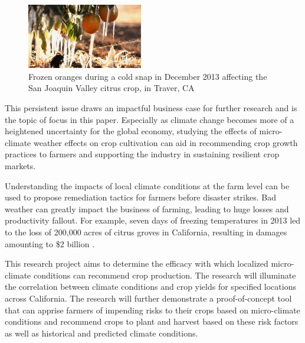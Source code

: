 \documentclass{article}
\begin{document}
\begin{figure}
  \begin{center}
    \vspace*{-5mm}
    \includegraphics[width=0.45\textwidth]{Final_Report/images/frozen_oranges.jpeg}
  \end{center}
  \vspace*{-5mm}\caption{Frozen oranges during a cold snap in December 2013 affecting the San Joaquin Valley citrus crop, in Traver, CA \citep{Orange}}
\end{figure}

This persistent issue draws an impactful business case for further research and is the topic of focus in this paper. Especially as climate change becomes more of a heightened uncertainty for the global economy, studying the effects of micro-climate weather effects on crop cultivation can aid in recommending crop growth practices to farmers and supporting the industry in sustaining resilient crop markets.

Understanding the impacts of local climate conditions at the farm level can be used to propose remediation tactics for farmers before disaster strikes. Bad weather can greatly impact the business of farming, leading to huge losses and productivity fallout. For example, seven days of freezing temperatures in 2013 led to the loss of 200,000 acres of citrus groves in California, resulting in damages amounting to \$2 billion \citep{CNBC}.

This research project aims to determine the efficacy with which localized micro-climate conditions can recommend crop production. The research will illuminate the correlation between climate conditions and crop yields for specified locations across California. The research will further demonstrate a proof-of-concept tool that can apprise farmers of impending risks to their crops based on micro-climate conditions and recommend crops to plant and harvest based on these risk factors as well as historical and predicted climate conditions. 

\end{document}
